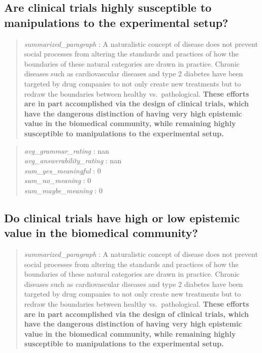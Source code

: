 \hypertarget{are-clinical-trials-highly-susceptible-to-manipulations-to-the-experimental-setup}{%
\subsection{Are clinical trials highly susceptible to manipulations to
the experimental
setup?}\label{are-clinical-trials-highly-susceptible-to-manipulations-to-the-experimental-setup}}

\begin{quote}
\emph{summarized\_paragraph} : A naturalistic concept of disease does
not prevent social processes from altering the standards and practices
of how the boundaries of these natural categories are drawn in practice.
Chronic diseases such as cardiovascular diseases and type 2 diabetes
have been targeted by drug companies to not only create new treatments
but to redraw the boundaries between healthy vs.~pathological.
\textbf{These efforts are in part accomplished via the design of
clinical trials, which have the dangerous distinction of having very
high epistemic value in the biomedical community, while remaining highly
susceptible to manipulations to the experimental setup.}
\end{quote}

\begin{quote}
\emph{avg\_grammar\_rating} : nan\\
\emph{avg\_answerability\_rating} : nan\\
\emph{sum\_yes\_meaningful} : 0\\
\emph{sum\_no\_meaning} : 0\\
\emph{sum\_maybe\_meaning} : 0
\end{quote}

\hypertarget{do-clinical-trials-have-high-or-low-epistemic-value-in-the-biomedical-community}{%
\subsection{Do clinical trials have high or low epistemic value in the
biomedical
community?}\label{do-clinical-trials-have-high-or-low-epistemic-value-in-the-biomedical-community}}

\begin{quote}
\emph{summarized\_paragraph} : A naturalistic concept of disease does
not prevent social processes from altering the standards and practices
of how the boundaries of these natural categories are drawn in practice.
Chronic diseases such as cardiovascular diseases and type 2 diabetes
have been targeted by drug companies to not only create new treatments
but to redraw the boundaries between healthy vs.~pathological.
\textbf{These efforts are in part accomplished via the design of
clinical trials, which have the dangerous distinction of having very
high epistemic value in the biomedical community, while remaining highly
susceptible to manipulations to the experimental setup.}
\end{quote}

